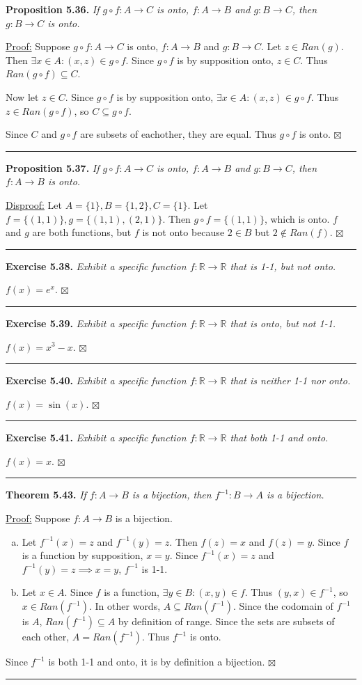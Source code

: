 \documentclass[a4paper,12pt]{article}
\newcommand{\entry}[3]
{
   \noindent\textbf{#1.}
   \emph{#2}
   \bigskip

   \noindent#3
   \bigskip
   \hrule
   \vspace{24pt}
}
\newcommand{\reals}{\mathbb{R}}
\newcommand{\sig}{$\boxtimes$}
\begin{document}
\entry{Proposition 5.36}
{If $g \circ f : A \to C$ is onto, $f : A \to B$ and $g : B \to C$, then $g : B \to C$ is onto.}
{
\underline{Proof:} Suppose $g \circ f : A \to C$ is onto, $f : A \to B$ and $g : B \to C$. Let $z \in Ran(g)$. Then $\exists x \in A : (x, z) \in g \circ f$. Since $g \circ f$ is by supposition onto, $z \in C$. Thus $Ran(g \circ f) \subseteq C$.

Now let $z \in C$. Since $g \circ f$ is by supposition onto, $\exists x \in A : (x, z) \in g \circ f$. Thus $z \in Ran(g \circ f)$, so $C \subseteq g \circ f$. 

Since $C$ and $g \circ f$ are subsets of eachother, they are equal. Thus $g \circ f$ is onto. \sig
}



\entry{Proposition 5.37}
{If $g \circ f : A \to C$ is onto, $f : A \to B$ and $g : B \to C$, then $f : A \to B$ is onto.}
{
\underline{Disproof:} Let $A = \{ 1 \}, B = \{ 1, 2 \}, C = \{ 1 \}$. Let $f = \{ (1, 1) \}, g = \{ (1, 1), (2, 1) \}$. Then $g \circ f = \{ (1, 1) \}$, which is onto. $f$ and $g$ are both functions, but $f$ is not onto because $2 \in B$ but $2 \not\in Ran(f)$. \sig
}



\entry{Exercise 5.38}
{Exhibit a specific function $f : \reals \to \reals$ that is 1-1, but not onto.}
{
$f(x) = e^x$. \sig
}



\entry{Exercise 5.39}
{Exhibit a specific function $f : \reals \to \reals$ that is onto, but not 1-1.}
{
$f(x) = x^3 - x$. \sig
}



\entry{Exercise 5.40}
{Exhibit a specific function $f : \reals \to \reals$ that is neither 1-1 nor onto.}
{
$f(x) = \sin(x)$. \sig
}



\entry{Exercise 5.41}
{Exhibit a specific function $f : \reals \to \reals$ that both 1-1 and onto.}
{
$f(x) = x$. \sig
}



\entry{Theorem 5.43}
{If $f : A \to B$ is a bijection, then $f^{-1} : B \to A$ is a bijection.}
{
\underline{Proof:} Suppose $f : A \to B$ is a bijection.
\begin{enumerate}[(a)]
\item
Let $f^{-1}(x) = z$ and $f^{-1}(y) = z$. Then $f(z) = x$ and $f(z) = y$. Since $f$ is a function by supposition, $x = y$. Since $f^{-1}(x) = z$ and $f^{-1}(y) = z \implies x = y$, $f^{-1}$ is 1-1.
\item
Let $x \in A$. Since $f$ is a function, $\exists y \in B : (x, y) \in f$. Thus $(y, x) \in f^{-1}$, so $x \in Ran(f^{-1})$. In other words, $A \subseteq Ran(f^{-1})$. Since the codomain of $f^{-1}$ is $A$, $Ran(f^{-1}) \subseteq A$ by definition of range. Since the sets are subsets of each other, $A = Ran(f^{-1})$. Thus $f^{-1}$ is onto.
\end{enumerate}
Since $f^{-1}$ is both 1-1 and onto, it is by definition a bijection. \sig
}
\end{document}
